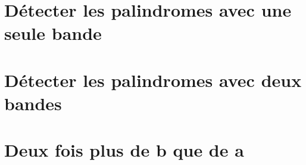 \documentclass[a4paper, 12pt]{scrartcl}
\begin{document}
	


\newpage
\section{Détecter les palindromes avec une seule bande}

	



\newpage
\section{Détecter les palindromes avec deux bandes}

	



\newpage
\section{Deux fois plus de b que de a}

	
\end{document}
